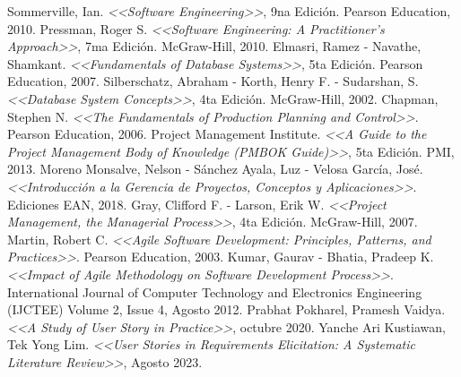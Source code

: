 \documentclass[a4paper, 12pt,twoside]{report}  %
\numberwithin{equation}{subsection} %
\begin{document}
\renewcommand{\bibname}{Bibliografía}
\begin{thebibliography}{99}

 Sommerville, Ian. \textit{<<Software Engineering>>}, 9na Edición. Pearson Education, 2010.
 Pressman, Roger S. \textit{<<Software Engineering: A Practitioner's Approach>>}, 7ma Edición. McGraw-Hill, 2010.
 Elmasri, Ramez - Navathe, Shamkant. \textit{<<Fundamentals of Database Systems>>}, 5ta Edición. Pearson Education, 2007.
 Silberschatz, Abraham - Korth, Henry F. - Sudarshan, S. \textit{<<Database System Concepts>>}, 4ta Edición. McGraw-Hill, 2002.
 Chapman, Stephen N. \textit{<<The Fundamentals of Production Planning and Control>>}. Pearson Education, 2006.
 Project Management Institute. \textit{<<A Guide to the Project Management Body of Knowledge (PMBOK Guide)>>}, 5ta Edición. PMI, 2013.
 Moreno Monsalve, Nelson - Sánchez Ayala, Luz - Velosa García, José. \textit{<<Introducción a la Gerencia de Proyectos, Conceptos y Aplicaciones>>}. Ediciones EAN, 2018.
 Gray, Clifford F. - Larson, Erik W. \textit{<<Project Management, the Managerial Process>>}, 4ta Edición. McGraw-Hill, 2007.
 Martin, Robert C. \textit{<<Agile Software Development: Principles, Patterns, and Practices>>}.  Pearson Education, 2003.
 Kumar, Gaurav - Bhatia, Pradeep K. \textit{<<Impact of Agile Methodology on Software Development Process>>}. International Journal of Computer Technology and Electronics Engineering (IJCTEE)
Volume 2, Issue 4, Agosto 2012.
 Prabhat Pokharel, Pramesh Vaidya. \textit{<<A Study of User Story in Practice>>}, octubre 2020.
 Yanche Ari Kustiawan, Tek Yong Lim. \textit{<<User Stories in Requirements Elicitation: A Systematic Literature Review>>}, Agosto 2023.
\end{thebibliography}
\end{document}
